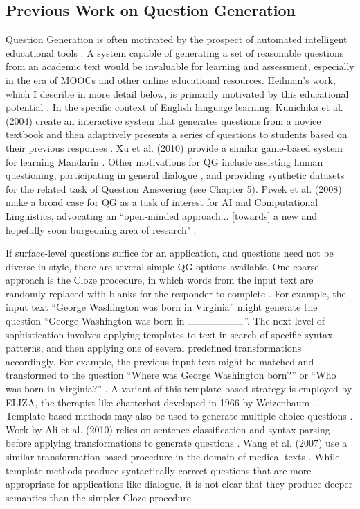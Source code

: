 \subsection{Previous Work on Question Generation}

Question Generation is often motivated by the prospect of automated intelligent educational tools  \citep{graesser2005scaffolding, heilman2011automatic}. A system capable of generating a set of reasonable questions from an academic text would be invaluable for learning and assessment, especially in the era of MOOCs and other online educational resources. Heilman's work, which I describe in more detail below, is primarily motivated by this educational potential  \citep{heilman2011automatic}. In the specific context of English language learning, Kunichika et al. (2004) create an interactive system that generates questions from a novice textbook and then adaptively presents a series of questions to students based on their previous responses  \citep{kunichika2004automated}. Xu et al. (2010) provide a similar game-based system for learning Mandarin  \citep{xu2009automatic}. Other motivations for QG include assisting human questioning, participating in general dialogue  \citep{walker2001spot}, and providing synthetic datasets for the related task of Question Answering (see Chapter 5). Piwek et al. (2008) make a broad case for QG as a task of interest for AI and Computational Linguistics, advocating an ``open-minded approach... [towards] a new and hopefully soon burgeoning area of research"  \citep{piwek2008generating}.

If surface-level questions suffice for an application, and questions need not be diverse in style, there are several simple QG options available. One coarse approach is the Cloze procedure, in which words from the input text are randomly replaced with blanks for the responder to complete  \citep{taylor1953cloze}. For example, the input text ``George Washington was born in Virginia'' might generate the question ``George Washington was born in $\rule{2cm}{0.05mm}$''. The next level of sophistication involves applying templates to text in search of specific syntax patterns, and then applying one of several predefined transformations accordingly. For example, the previous input text might be matched and transformed to the question ``Where was George Washington born?'' or ``Who was born in Virginia?''  \citep{gates2008automatically, kunichika2004automated, heilman2011automatic}. A variant of this template-based strategy is employed by ELIZA, the therapist-like chatterbot developed in 1966 by Weizenbaum  \citep{weizenbaum1966eliza}. Template-based methods may also be used to generate multiple choice questions  \citep{mitkov2006computer}. Work by Ali et al. (2010) relies on sentence classification and syntax parsing before applying transformations to generate questions  \citep{ali2010automatic}.  Wang et al. (2007) use a similar transformation-based procedure in the domain of medical texts  \citep{wang2007automatic}. While template methods produce syntactically correct questions that are more appropriate for applications like dialogue, it is not clear that they produce deeper semantics than the simpler Cloze procedure. 

